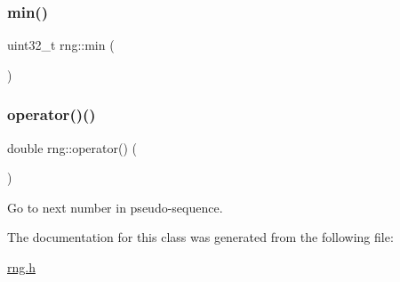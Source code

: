 \hypertarget{classrng_a2619e124008ebc19fef93983f50eaf50}{}\label{classrng_a2619e124008ebc19fef93983f50eaf50} 
\subsubsection{\texorpdfstring{min()}{min()}}
{\footnotesize\ttfamily uint32\+\_\+t rng\+::min (\begin{DoxyParamCaption}{ }\end{DoxyParamCaption})\hspace{0.3cm}{\ttfamily [inline]}}

\hypertarget{classrng_a58c53a0d8e075b75c4d1eb4d4af5fe7f}{}\label{classrng_a58c53a0d8e075b75c4d1eb4d4af5fe7f} 
\subsubsection{\texorpdfstring{operator()()}{operator()()}}
{\footnotesize\ttfamily double rng\+::operator() (\begin{DoxyParamCaption}{ }\end{DoxyParamCaption})\hspace{0.3cm}{\ttfamily [inline]}}



Go to next number in pseudo-\/sequence. 



The documentation for this class was generated from the following file\+:\begin{DoxyCompactItemize}
\item 
\hyperlink{rng_8h}{rng.\+h}\end{DoxyCompactItemize}
